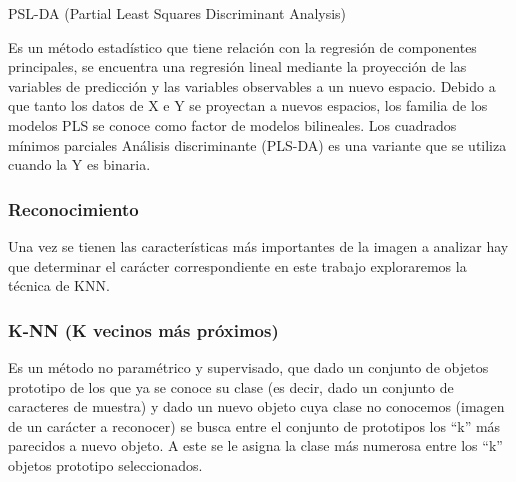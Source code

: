 {\ttfamily PSL-DA (Partial Least Squares Discriminant Analysis)}

Es un método estadístico que tiene relación con la regresión de componentes principales, se encuentra una regresión lineal mediante la proyección de las variables de predicción y las variables observables a un nuevo espacio. Debido a que tanto los datos de X e Y se proyectan a nuevos espacios, los familia de los modelos PLS se conoce como factor de modelos bilineales. Los cuadrados mínimos parciales Análisis discriminante (PLS-DA) es una variante que se utiliza cuando la Y es binaria.


\subsubsection{Reconocimiento}

Una  vez  se  tienen  las  características  más  importantes de la imagen a analizar hay que determinar el  carácter correspondiente en este trabajo exploraremos la técnica de KNN.


\subsubsection{ K-NN (K vecinos más próximos)}

Es un método no paramétrico y supervisado, que dado un conjunto de objetos prototipo de los que ya se conoce su clase (es decir, dado un conjunto de caracteres de muestra) y dado un  nuevo objeto cuya clase no conocemos (imagen de un carácter a reconocer) se busca entre el conjunto de prototipos los “k” más parecidos a nuevo objeto. A este se le asigna la clase más numerosa entre los “k” objetos prototipo seleccionados.


